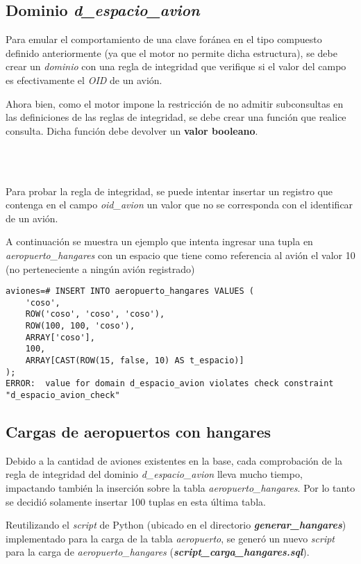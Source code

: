 \subsection{Dominio \emph{d\_espacio\_avion}}

Para emular el comportamiento de una clave foránea en el tipo compuesto definido anteriormente (ya que el motor no permite dicha estructura), se debe crear un \emph{dominio} con una regla de integridad que verifique si el valor del campo es efectivamente el \emph{OID} de un avión.

Ahora bien, como el motor impone la restricción de no admitir subconsultas en las definiciones de las reglas de integridad, se debe crear una función que realice consulta. Dicha función debe devolver un \textbf{valor booleano}. 

\\~

Para probar la regla de integridad, se puede intentar insertar un registro que contenga en el campo \emph{oid\_avion} un valor que no se corresponda con el identificar de un avión. 

A continuación se muestra un ejemplo que intenta ingresar una tupla en \emph{aeropuerto\_hangares} con un espacio que tiene como referencia al avión el valor 10 (no perteneciente a ningún avión registrado)

\vspace*{5mm}
\lstset{style=sql}
\begin{lstlisting}
aviones=# INSERT INTO aeropuerto_hangares VALUES (
    'coso', 
    ROW('coso', 'coso', 'coso'),
    ROW(100, 100, 'coso'),
    ARRAY['coso'],
    100,
    ARRAY[CAST(ROW(15, false, 10) AS t_espacio)]
);
ERROR:  value for domain d_espacio_avion violates check constraint "d_espacio_avion_check"
\end{lstlisting}

\subsection{Cargas de aeropuertos con hangares}

Debido a la cantidad de aviones existentes en la base, cada comprobación de la regla de integridad del dominio \emph{d\_espacio\_avion} lleva mucho tiempo, impactando también la inserción sobre la tabla \emph{aeropuerto\_hangares}. Por lo tanto se decidió solamente insertar 100 tuplas en esta última tabla.

Reutilizando el \emph{script} de Python (ubicado en el directorio \textbf{\emph{generar\_hangares}}) implementado para la carga de la tabla \emph{aeropuerto}, se generó un nuevo \emph{script} para la carga de \emph{aeropuerto\_hangares} (\textbf{\emph{script\_carga\_hangares.sql}}).


